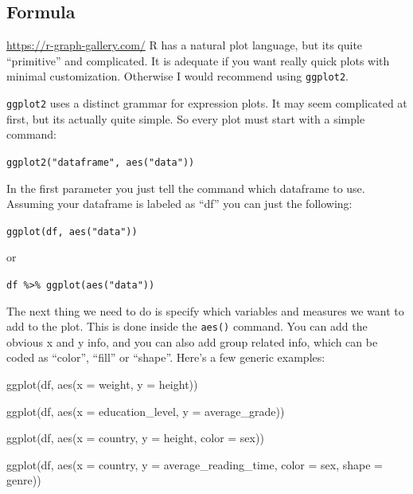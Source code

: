 \documentclass[
]{book}
\newenvironment{Shaded}{\begin{snugshade}}{\end{snugshade}}
\newcommand{\AttributeTok}[1]{\textcolor[rgb]{0.77,0.63,0.00}{#1}}
\newcommand{\FunctionTok}[1]{\textcolor[rgb]{0.00,0.00,0.00}{#1}}
\newcommand{\NormalTok}[1]{#1}
\begin{document}
\hypertarget{formula}{%
\subsection{Formula}\label{formula}}

\url{https://r-graph-gallery.com/} R has a natural plot language, but its quite ``primitive'' and complicated.
It is adequate if you want really quick plots with minimal customization.
Otherwise I would recommend using \texttt{ggplot2}.

\texttt{ggplot2} uses a distinct grammar for expression plots.
It may seem complicated at first, but its actually quite simple.
So every plot must start with a simple command:

\texttt{ggplot2("dataframe",\ aes("data"))}

In the first parameter you just tell the command which dataframe to use.
Assuming your dataframe is labeled as ``df'' you can just the following:

\texttt{ggplot(df,\ aes("data"))}

or

\texttt{df\ \%\textgreater{}\%\ ggplot(aes("data"))}

The next thing we need to do is specify which variables and measures we want to add to the plot.
This is done inside the \texttt{aes()} command.
You can add the obvious x and y info, and you can also add group related info, which can be coded as ``color'', ``fill'' or ``shape''.
Here's a few generic examples:

\begin{Shaded}
\begin{Highlighting}[]
\FunctionTok{ggplot}\NormalTok{(df, }\FunctionTok{aes}\NormalTok{(}\AttributeTok{x =}\NormalTok{ weight, }\AttributeTok{y =}\NormalTok{ height))}

\FunctionTok{ggplot}\NormalTok{(df, }\FunctionTok{aes}\NormalTok{(}\AttributeTok{x =}\NormalTok{ education\_level, }\AttributeTok{y =}\NormalTok{ average\_grade))}

\FunctionTok{ggplot}\NormalTok{(df, }\FunctionTok{aes}\NormalTok{(}\AttributeTok{x =}\NormalTok{ country, }\AttributeTok{y =}\NormalTok{ height, }\AttributeTok{color =}\NormalTok{ sex))}

\FunctionTok{ggplot}\NormalTok{(df, }\FunctionTok{aes}\NormalTok{(}\AttributeTok{x =}\NormalTok{ country, }\AttributeTok{y =}\NormalTok{ average\_reading\_time,}
               \AttributeTok{color =}\NormalTok{ sex, }\AttributeTok{shape =}\NormalTok{ genre))}
\end{Highlighting}
\end{Shaded}
\end{document}
